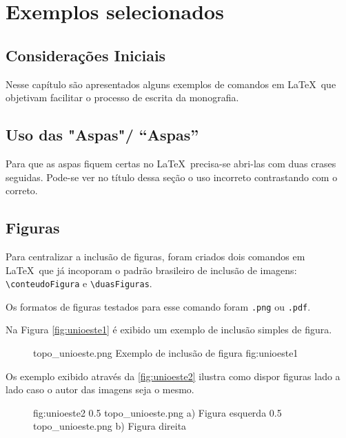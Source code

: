 \chapter {Exemplos selecionados} 
\label{cap:exemplos}


\section {Considerações Iniciais} 

Nesse capítulo são apresentados alguns exemplos de comandos em \LaTeX\ que objetivam facilitar o processo de escrita da monografia.

\section {Uso das "Aspas"/ ``Aspas''}

    Para que as aspas fiquem certas no \LaTeX\ precisa-se abri-las com duas crases seguidas. Pode-se ver no título dessa seção o uso incorreto contrastando com o correto.
    
\section{Figuras}

Para centralizar a inclusão de figuras, foram criados dois comandos em \LaTeX\ que já incoporam o padrão brasileiro de inclusão de imagens: \verb'\conteudoFigura'  e 
\verb'\duasFiguras'.

Os formatos de figuras testados para esse comando foram \verb'.png' ou \verb'.pdf'.

Na Figura \ref{fig:unioeste1} é exibido um exemplo de inclusão simples de figura.

\begin{figure}[h!]
    {topo_unioeste.png}                 %
    {Exemplo de inclusão de figura}     %
    {fig:unioeste1}                      %
\end{figure}
   
Os exemplo exibido através da \ref{fig:unioeste2} ilustra como dispor figuras lado a lado caso o autor das imagens seja o mesmo.

\begin{figure}[htb!]
        {fig:unioeste2}       %
        {0.5}                 %
        {topo_unioeste.png}   %
        {a) Figura esquerda}  %
        {0.5}                 %
        {topo_unioeste.png}   %
        {b) Figura direita}  %
\end{figure}

